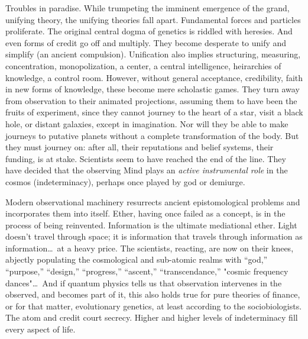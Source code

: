 Troubles in paradise. While trumpeting the imminent emergence of the grand, unifying theory, the unifying theories fall apart. Fundamental forces and particles proliferate. The original central dogma of genetics is riddled with heresies. And even forms of credit go off and multiply. They become desperate to unify and simplify (an ancient compulsion). Unification also implies structuring, measuring, concentration, monopolization, a center, a central intelligence, heirarchies of knowledge, a control room. However, without general acceptance, credibility, faith in new forms of knowledge, these become mere scholastic games. They turn away from observation to their animated projections, assuming them to have been the fruits of experiment, since they cannot journey to the heart of a star, visit a black hole, or distant galaxies, except in imagination. Nor will they be able to make journeys to putative planets without a complete transformation of the body. But they must journey on: after all, their reputations and belief systems, their funding, is at stake. Scientists seem to have reached the end of the line. They have decided that the observing Mind plays an \emph{active instrumental role} in the cosmos (indeterminacy), perhaps once played by god or demiurge.

Modern observational machinery resurrects ancient epistomological problems and incorporates them into itself. Ether, having once failed as a concept, is in the process of being reinvented. Information is the ultimate mediational ether. Light doesn't travel through space; it is information that travels through information as information\ldots\ at a heavy price. The scientists, reacting, are now on their knees, abjectly populating the cosmological and sub-atomic realms with \enquote{god,} \enquote{purpose,} \enquote{design,} \enquote{progress,} \enquote{ascent,} \enquote{transcendance,} "cosmic frequency dances"\ldots\ And if quantum physics tells us that observation intervenes in the observed, and becomes part of it, this also holds true for pure theories of finance, or for that matter, evolutionary genetics, at least according to the sociobiologists. The atom and credit court secrecy. Higher and higher levels of indeterminacy fill every aspect of life.

